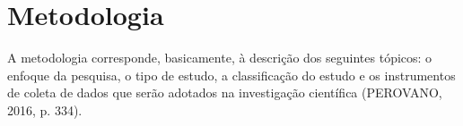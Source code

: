 \chapter{Metodologia}

A metodologia corresponde, basicamente, à descrição dos seguintes
tópicos: o enfoque da pesquisa, o tipo de estudo, a classificação do estudo e
os instrumentos de coleta de dados que serão adotados na investigação
científica (PEROVANO, 2016, p. 334).
